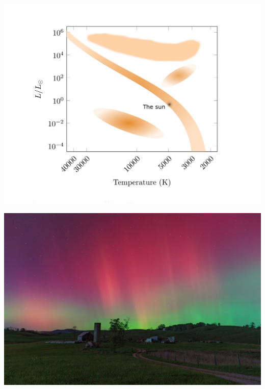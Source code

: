 \documentclass[a4paper]{tufte-handout}
\begin{document}
\begin{question}

\qpart
\begin{center}
\includegraphics{HR_diagram.jpg}
\end{center}
\vspace{5cm}
\qpart
\begin{center}
\includegraphics{Pic_of_day.jpeg}
\end{center}
\vspace{5cm}
\qpart
\begin{center}

\end{center}
\end{question}
\end{document}
